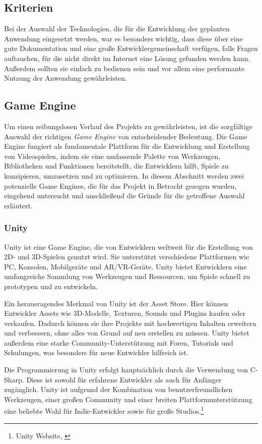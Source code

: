 \subsection{Kriterien}
Bei der Auswahl der Technologien, die für die Entwicklung der geplanten Anwendung eingesetzt werden, war es besonders
wichtig, dass diese über eine gute Dokumentation und eine große Entwicklergemeinschaft verfügen, falls Fragen auftauchen,
für die nicht direkt im Internet eine Lösung gefunden werden kann. Außerdem sollten sie einfach zu bedienen sein und vor
allem eine performante Nutzung der Anwendung gewährleisten.

\subsection{Game Engine}
Um einen reibungslosen Verlauf des Projekts zu gewährleisten, ist die sorgfältige Auswahl der richtigen \textit{Game Engine} von
entscheidender Bedeutung. Die Game Engine fungiert als fundamentale Plattform für die Entwicklung und Erstellung von
Videospielen, indem sie eine umfassende Palette von Werkzeugen, Bibliotheken und Funktionen bereitstellt, die Entwicklern
hilft, Spiele zu konzipieren, umzusetzen und zu optimieren. In diesem Abschnitt werden zwei potenzielle Game Engines,
die für das Projekt in Betracht gezogen wurden, eingehend untersucht und anschließend die Gründe für die getroffene Auswahl
erläutert.

\subsubsection{Unity}
Unity ist eine Game Engine, die von Entwicklern weltweit für die Erstellung von 2D- und 3D-Spielen genutzt wird. Sie
unterstützt verschiedene Plattformen wie PC, Konsolen, Mobilgeräte und AR/VR-Geräte. Unity bietet Entwicklern eine
umfangreiche Sammlung von Werkzeugen und Ressourcen, um Spiele schnell zu prototypen und zu entwickeln.

Ein herausragendes Merkmal von Unity ist der Asset Store. Hier können Entwickler Assets wie 3D-Modelle, Texturen, Sounds
und Plugins kaufen oder verkaufen. Dadurch können sie ihre Projekte mit hochwertigen Inhalten erweitern und verbessern,
ohne alles von Grund auf neu erstellen zu müssen. Unity bietet außerdem eine starke Community-Unterstützung mit Foren,
Tutorials und Schulungen, was besonders für neue Entwickler hilfreich ist.

Die Programmierung in Unity erfolgt hauptsächlich durch die Verwendung von C-Sharp. Diese ist sowohl für
erfahrene Entwickler als auch für Anfänger zugänglich. Unity ist aufgrund der Kombination von benutzerfreundlichen Werkzeugen,
einer großen Community und einer breiten Plattformunterstützung eine beliebte Wahl für Indie-Entwickler sowie für große Studios.\footnote{Unity Website, \cite{https://unity.com/}}

